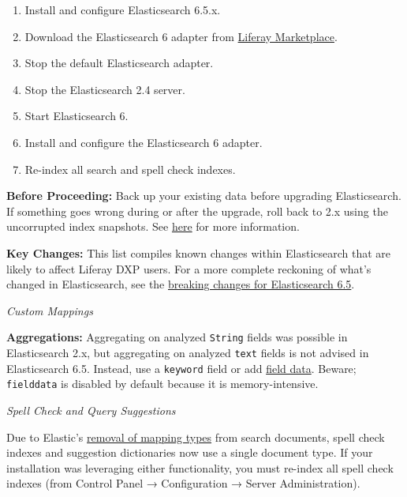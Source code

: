 \begin{enumerate}
\def\labelenumi{\arabic{enumi}.}
\item
  Install and configure Elasticsearch 6.5.x.
\item
  Download the Elasticsearch 6 adapter from
  \href{https://web.liferay.com/marketplace}{Liferay Marketplace}.
\item
  Stop the default Elasticsearch adapter.
\item
  Stop the Elasticsearch 2.4 server.
\item
  Start Elasticsearch 6.
\item
  Install and configure the Elasticsearch 6 adapter.
\item
  Re-index all search and spell check indexes.
\end{enumerate}

\textbf{Before Proceeding:} Back up your existing data before upgrading
Elasticsearch. If something goes wrong during or after the upgrade, roll
back to 2.x using the uncorrupted index snapshots. See
\href{/docs/7-0/deploy/-/knowledge_base/d/backing-up-elasticsearch}{here}
for more information.

\noindent\hrulefill

\textbf{Key Changes:} This list compiles known changes within
Elasticsearch that are likely to affect Liferay DXP users. For a more
complete reckoning of what's changed in Elasticsearch, see the
\href{https://www.elastic.co/guide/en/elasticsearch/reference/6.5/breaking-changes.html}{breaking
changes for Elasticsearch 6.5}.

\emph{Custom Mappings}

\textbf{Aggregations:} Aggregating on analyzed \texttt{String} fields
was possible in Elasticsearch 2.x, but aggregating on analyzed
\texttt{text} fields is not advised in Elasticsearch 6.5. Instead, use a
\texttt{keyword} field or add
\href{https://www.elastic.co/guide/en/elasticsearch/reference/6.5/fielddata.html}{field
data}. Beware; \texttt{fielddata} is disabled by default because it is
memory-intensive.

\emph{Spell Check and Query Suggestions}

Due to Elastic's
\href{https://www.elastic.co/guide/en/elasticsearch/reference/6.5/removal-of-types.html}{removal
of mapping types} from search documents, spell check indexes and
suggestion dictionaries now use a single document type. If your
installation was leveraging either functionality, you must re-index all
spell check indexes (from Control Panel → Configuration → Server
Administration).

